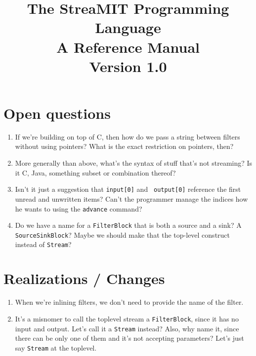 \documentclass[draft]{article}
\title{The StreaMIT Programming Language \\ A Reference Manual \\ Version 1.0}
\begin{document}
\maketitle

\section{Open questions}

\begin{enumerate}

\item If we're building on top of C, then how do we pass a string
between filters without using pointers?  What is the exact restriction
on pointers, then?

\item More generally than above, what's the syntax of stuff that's not
streaming?  Is it C, Java, something subset or combination thereof?

\item Isn't it just a suggestion that {\tt input[0]} and {\tt
output[0]} reference the first unread and unwritten items?  Can't the
programmer manage the indices how he wants to using the {\tt advance}
command?

\item Do we have a name for a {\tt FilterBlock} that is both a source
and a sink?  A {\tt SourceSinkBlock}?  Maybe we should make that the
top-level construct instead of {\tt Stream}?

\end{enumerate}

\section{Realizations / Changes}

\begin{enumerate}

\item When we're inlining filters, we don't need to provide the name
of the filter.

\item It's a misnomer to call the toplevel stream a {\tt FilterBlock},
since it has no input and output.  Let's call it a {\tt Stream}
instead?  Also, why name it, since there can be only one of them and
it's not accepting parameters?  Let's just say {\tt Stream} at the
toplevel.

\end{enumerate}
\end{document}
